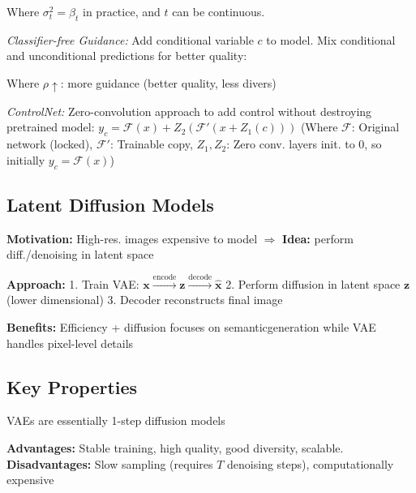 Where $\sigma_t^2 = \beta_t$ in practice, and $t$ can be continuous.

\emph{Classifier-free Guidance:} Add conditional variable $c$ to model. Mix conditional and unconditional predictions for better quality:

Where $\rho \uparrow$: more guidance (better quality, less divers)

\emph{ControlNet:} Zero-convolution approach to add control without destroying pretrained model: $y_c = \mathcal{F}(x) + Z_2(\mathcal{F}'(x + Z_1(c)))$ (Where $\mathcal{F}$: Original network (locked), $\mathcal{F}'$: Trainable copy, $Z_1, Z_2$: Zero conv. layers init. to $0$, so initially $y_c = \mathcal{F}(x)$)

\subsection{Latent Diffusion Models}

\textbf{Motivation:} High-res. images expensive to model $\Rightarrow$ \textbf{Idea:} perform diff./denoising in latent space

\textbf{Approach:} 
1. Train VAE: $\mathbf{x} \xrightarrow{\text{encode}} \mathbf{z} \xrightarrow{\text{decode}} \hat{\mathbf{x}}$
2. Perform diffusion in latent space $\mathbf{z}$ (lower dimensional)
3. Decoder reconstructs final image

\textbf{Benefits:} Efficiency + diffusion focuses on \flqq semantic\frqq generation while VAE handles pixel-level details

\subsection{Key Properties}

VAEs are essentially 1-step diffusion models

\textbf{Advantages:} Stable training, high quality, good diversity, scalable. 
\textbf{Disadvantages:} Slow sampling (requires $T$ denoising steps), computationally expensive